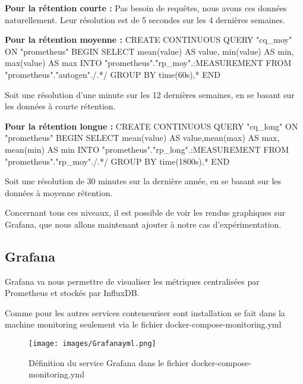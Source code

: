 \documentclass[oneside,12pt]{report}
\begin{document}
\textbf{Pour la rétention courte :} Pas besoin de requêtes, nous avons ces données naturellement. Leur résolution est de 5 secondes sur les 4 dernières semaines.\newline

\textbf{Pour la rétention moyenne :}\newline
{\fontsize{9}{10}\selectfont CREATE CONTINUOUS QUERY "cq\_moy" ON "prometheus" BEGIN SELECT mean(value) AS value, min(value) AS min, max(value) AS max INTO "prometheus"."rp\_moy".:MEASUREMENT FROM "prometheus"."autogen"./.*/ GROUP BY time(60s),* END}\newline

Soit une résolution d'une minute sur les 12 dernières semaines, en se basant sur les données à courte rétention.\newline

\textbf{Pour la rétention longue :}\newline
{\fontsize{9}{10}\selectfont CREATE CONTINUOUS QUERY "cq\_long" ON "prometheus" BEGIN SELECT mean(value) AS value,mean(max) AS max, mean(min) AS min INTO "prometheus"."rp\_long".:MEASUREMENT FROM "prometheus"."rp\_moy"./.*/ GROUP BY time(1800s),* END}\newline

Soit une résolution de 30 minutes sur la dernière année, en se basant sur les données à moyenne rétention. \newline

Concernant tous ces niveaux, il est possible de voir les rendus graphiques sur Grafana, que nous allons maintenant ajouter à notre cas d'expérimentation.

\subsection{Grafana}

Grafana va nous permettre de visualiser les métriques centralisées par Prometheus et stockés par InfluxDB.\newline 

Comme pour les autres services conteneuriser sont installation se fait dans la machine monitoring seulement via le fichier docker-compose-monitoring.yml

\begin{figure}[H]
    \centering
    \texttt{[image: images/Grafanayml.png]}
    \caption{Définition du service Grafana dans le fichier docker-compose-monitoring.yml}
    \label{fig:mesh1}
\end{figure}
\end{document}
